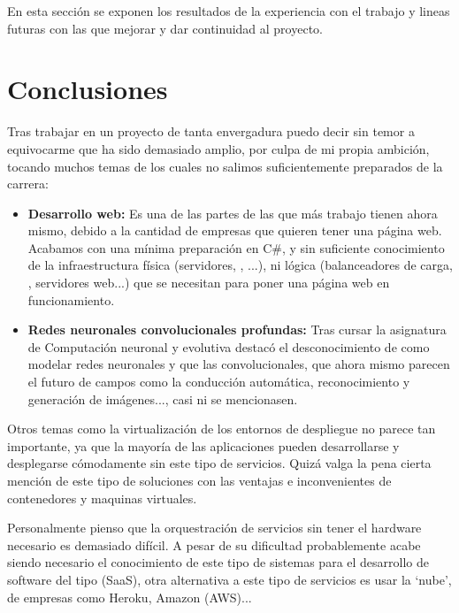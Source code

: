 
En esta sección se exponen los resultados de la experiencia con el trabajo y lineas futuras con las que mejorar y dar continuidad al proyecto.

\section{Conclusiones}

Tras trabajar en un proyecto de tanta envergadura puedo decir sin temor a equivocarme que ha sido demasiado amplio, por culpa de mi propia ambición, tocando muchos temas de los cuales no salimos suficientemente preparados de la carrera:

\begin{itemize}
\item \textbf{Desarrollo web:} Es una de las partes de las que más trabajo tienen ahora mismo, debido a la cantidad de empresas que quieren tener una página web. Acabamos con una mínima preparación en C\#, y sin suficiente conocimiento de la infraestructura física (servidores, , ...), ni lógica (balanceadores de carga, , servidores web...) que se necesitan para poner una página web en funcionamiento.
\item \textbf{Redes neuronales convolucionales profundas:} Tras cursar la asignatura de Computación neuronal y evolutiva destacó el desconocimiento de como modelar redes neuronales y que las convolucionales, que ahora mismo parecen el futuro de campos como la conducción automática, reconocimiento y generación de imágenes..., casi ni se mencionasen.
\end{itemize}

Otros temas como la virtualización de los entornos de despliegue no parece tan importante, ya que la mayoría de las aplicaciones pueden desarrollarse y desplegarse cómodamente sin este tipo de servicios. Quizá valga la pena cierta mención de este tipo de soluciones con las ventajas e inconvenientes de contenedores y maquinas virtuales. 

Personalmente pienso que la orquestración de servicios sin tener el hardware necesario es demasiado difícil. A pesar de su dificultad probablemente acabe siendo necesario el conocimiento de este tipo de sistemas para el desarrollo de software del tipo  (SaaS), otra alternativa a este tipo de servicios es usar la `nube', de empresas como Heroku, Amazon (AWS)...

